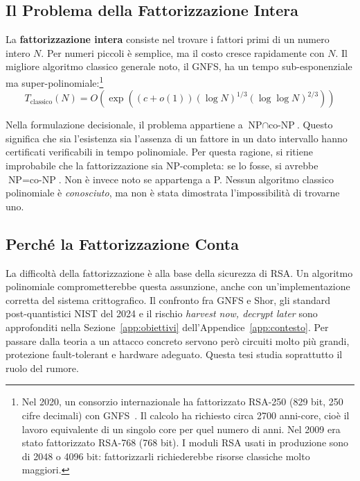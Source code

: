 \begin{onehalfspace}

\bigskip
\section{Il Problema della Fattorizzazione Intera}

La \textbf{fattorizzazione intera} consiste nel trovare i fattori primi di un numero intero $N$. Per numeri piccoli è semplice, ma il costo cresce rapidamente con $N$. Il migliore algoritmo classico generale noto, il \ac{GNFS}, ha un tempo sub-esponenziale ma super-polinomiale:\footnote{Nel 2020, un consorzio internazionale ha fattorizzato RSA-250 (829 bit, 250 cifre decimali) con \ac{GNFS}~\cite{rsa250_2020}. Il calcolo ha richiesto circa 2700 anni-core, cioè il lavoro equivalente di un singolo core per quel numero di anni. Nel 2009 era stato fattorizzato RSA-768 (768 bit). I moduli RSA usati in produzione sono di 2048 o 4096 bit: fattorizzarli richiederebbe risorse classiche molto maggiori.}
\begin{equation}
    T_{\text{classico}}(N) = O\!\left(\exp\!\left((c+o(1))(\log N)^{1/3}(\log\log N)^{2/3}\right)\right)
    \label{eq:gnfs_complexity}
\end{equation}

Nella formulazione decisionale, il problema appartiene a $\text{NP} \cap \text{co-NP}$. Questo significa che sia l'esistenza sia l'assenza di un fattore in un dato intervallo hanno certificati verificabili in tempo polinomiale. Per questa ragione, si ritiene improbabile che la fattorizzazione sia NP-completa: se lo fosse, si avrebbe $\text{NP} = \text{co-NP}$. Non è invece noto se appartenga a P. Nessun algoritmo classico polinomiale è \emph{conosciuto}, ma non è stata dimostrata l'impossibilità di trovarne uno.

\subsection{Perché la Fattorizzazione Conta}

La difficoltà della fattorizzazione è alla base della sicurezza di \ac{RSA}. Un algoritmo polinomiale comprometterebbe questa assunzione, anche con un'implementazione corretta del sistema crittografico. Il confronto fra \ac{GNFS} e Shor, gli standard post-quantistici \ac{NIST} del 2024 e il rischio \emph{harvest now, decrypt later} sono approfonditi nella Sezione~\ref{app:obiettivi} dell'Appendice~\ref{app:contesto}. Per passare dalla teoria a un attacco concreto servono però circuiti molto più grandi, protezione fault-tolerant e hardware adeguato. Questa tesi studia soprattutto il ruolo del rumore.


\end{onehalfspace}
